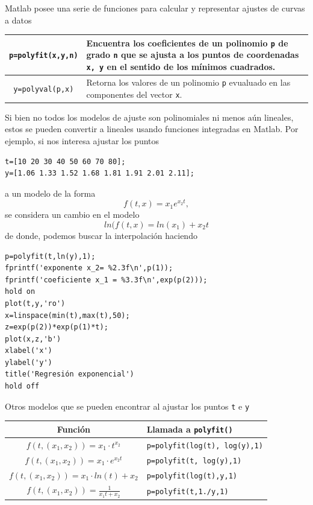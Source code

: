 \documentclass[11pt]{article}
\begin{document}
Matlab posee una serie de funciones para calcular y representar ajustes de curvas a datos
\begin{longtable}{||c|p{}||}
\hline
\texttt{p=polyfit(x,y,n)} 
	& Encuentra los coeficientes de un polinomio \texttt{p} de grado \texttt{n} que se ajusta a los puntos de coordenadas \texttt{x, y} en el sentido de los m\'inimos cuadrados.
\\
\hline
\texttt{y=polyval(p,x)} 
	& Retorna los valores de un polinomio \texttt{p} evualuado en las componentes del vector \texttt{x}.\\
\hline
\end{longtable}

Si bien no todos los modelos de ajuste son polinomiales ni menos a\'un lineales, estos se pueden convertir a lineales usando funciones integradas en Matlab. Por ejemplo, si nos interesa ajustar los puntos 
\begin{verbatim}
t=[10 20 30 40 50 60 70 80];
y=[1.06 1.33 1.52 1.68 1.81 1.91 2.01 2.11];
\end{verbatim}
a un modelo de la forma 
$$
f(t,x)=x_1e^{x_2 t},
$$
se considera un cambio en el modelo
$$
ln(f(t,x)= ln(x_1)+ x_2t
$$
de donde, podemos buscar la interpolaci\'on haciendo
\begin{verbatim}
p=polyfit(t,ln(y),1);
fprintf('exponente x_2= %2.3f\n',p(1));
fprintf('coeficiente x_1 = %3.3f\n',exp(p(2)));
hold on
plot(t,y,'ro')
x=linspace(min(t),max(t),50);
z=exp(p(2))*exp(p(1)*t);
plot(x,z,'b')
xlabel('x')
ylabel('y')
title('Regresión exponencial')
hold off
\end{verbatim}

Otros modelos que se pueden encontrar al ajustar los puntos \texttt{t} e \texttt{y}
\begin{center}
	\begin{tabular}{||c|l||}
    \hline
    Función				& Llamada a \texttt{polyfit()} \\
\hline
    $f(t,(x_1,x_2))=x_1\cdot t^{x_2}$		& \texttt{p=polyfit(log(t), log(y),1)}\\
 \hline
	$f(t,(x_1,x_2))=x_1\cdot e^{x_2t}$		& \texttt{p=polyfit(t, log(y),1)}\\
\hline    
    $f(t,(x_1,x_2))=x_1 \cdot ln(t)+x_2$	& \texttt{p=polyfit(log(t),y,1)} \\
\hline
    $f(t,(x_1,x_2))=\frac{1}{x_1t+x_2}$		& \texttt{p=polyfit(t,1./y,1)}\\ 
    \hline
    \end{tabular}
\end{center}
\end{document}
